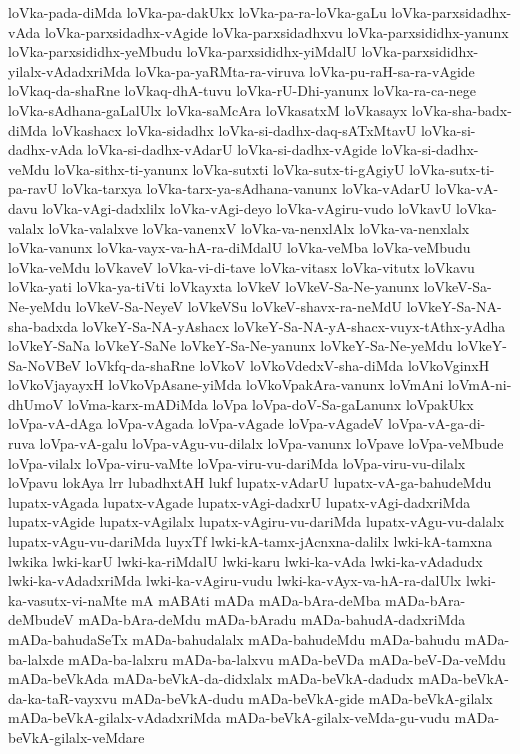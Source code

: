 {loVka-pada-diMda
loVka-pa-dakUkx
loVka-pa-ra-loVka-gaLu
loVka-parxsidadhx-vAda
loVka-parxsidadhx-vAgide
loVka-parxsidadhxvu
loVka-parxsididhx-yanunx
loVka-parxsididhx-yeMbudu
loVka-parxsididhx-yiMdalU
loVka-parxsididhx-yilalx-vAdadxriMda
loVka-pa-yaRMta-ra-viruva
loVka-pu-raH-sa-ra-vAgide
loVkaq-da-shaRne
loVkaq-dhA-tuvu
loVka-rU-Dhi-yanunx
loVka-ra-ca-nege
loVka-sAdhana-gaLalUlx
loVka-saMcAra
loVkasatxM
loVkasayx
loVka-sha-badx-diMda
loVkashacx
loVka-sidadhx
loVka-si-dadhx-daq-sATxMtavU
loVka-si-dadhx-vAda
loVka-si-dadhx-vAdarU
loVka-si-dadhx-vAgide
loVka-si-dadhx-veMdu
loVka-sithx-ti-yanunx
loVka-sutxti
loVka-sutx-ti-gAgiyU
loVka-sutx-ti-pa-ravU
loVka-tarxya
loVka-tarx-ya-sAdhana-vanunx
loVka-vAdarU
loVka-vA-davu
loVka-vAgi-dadxlilx
loVka-vAgi-deyo
loVka-vAgiru-vudo
loVkavU
loVka-valalx
loVka-valalxve
loVka-vanenxV
loVka-va-nenxlAlx
loVka-va-nenxlalx
loVka-vanunx
loVka-vayx-va-hA-ra-diMdalU
loVka-veMba
loVka-veMbudu
loVka-veMdu
loVkaveV
loVka-vi-di-tave
loVka-vitasx
loVka-vitutx
loVkavu
loVka-yati
loVka-ya-tiVti
loVkayxta
loVkeV
loVkeV-Sa-Ne-yanunx
loVkeV-Sa-Ne-yeMdu
loVkeV-Sa-NeyeV
loVkeVSu
loVkeV-shavx-ra-neMdU
loVkeY-Sa-NA-sha-badxda
loVkeY-Sa-NA-yAshacx
loVkeY-Sa-NA-yA-shacx-vuyx-tAthx-yAdha
loVkeY-SaNa
loVkeY-SaNe
loVkeY-Sa-Ne-yanunx
loVkeY-Sa-Ne-yeMdu
loVkeY-Sa-NoVBeV
loVkfq-da-shaRne
loVkoV
loVkoVdedxV-sha-diMda
loVkoVginxH
loVkoVjayayxH
loVkoVpAsane-yiMda
loVkoVpakAra-vanunx
loVmAni
loVmA-ni-dhUmoV
loVma-karx-mADiMda
loVpa
loVpa-doV-Sa-gaLanunx
loVpakUkx
loVpa-vA-dAga
loVpa-vAgada
loVpa-vAgade
loVpa-vAgadeV
loVpa-vA-ga-di-ruva
loVpa-vA-galu
loVpa-vAgu-vu-dilalx
loVpa-vanunx
loVpave
loVpa-veMbude
loVpa-vilalx
loVpa-viru-vaMte
loVpa-viru-vu-dariMda
loVpa-viru-vu-dilalx
loVpavu
lokAya
lrr
lubadhxtAH
lukf
lupatx-vAdarU
lupatx-vA-ga-bahudeMdu
lupatx-vAgada
lupatx-vAgade
lupatx-vAgi-dadxrU
lupatx-vAgi-dadxriMda
lupatx-vAgide
lupatx-vAgilalx
lupatx-vAgiru-vu-dariMda
lupatx-vAgu-vu-dalalx
lupatx-vAgu-vu-dariMda
luyxTf
lwki-kA-tamx-jAcnxna-dalilx
lwki-kA-tamxna
lwkika
lwki-karU
lwki-ka-riMdalU
lwki-karu
lwki-ka-vAda
lwki-ka-vAdadudx
lwki-ka-vAdadxriMda
lwki-ka-vAgiru-vudu
lwki-ka-vAyx-va-hA-ra-dalUlx
lwki-ka-vasutx-vi-naMte
mA
mABAti
mADa
mADa-bAra-deMba
mADa-bAra-deMbudeV
mADa-bAra-deMdu
mADa-bAradu
mADa-bahudA-dadxriMda
mADa-bahudaSeTx
mADa-bahudalalx
mADa-bahudeMdu
mADa-bahudu
mADa-ba-lalxde
mADa-ba-lalxru
mADa-ba-lalxvu
mADa-beVDa
mADa-beV-Da-veMdu
mADa-beVkAda
mADa-beVkA-da-didxlalx
mADa-beVkA-dadudx
mADa-beVkA-da-ka-taR-vayxvu
mADa-beVkA-dudu
mADa-beVkA-gide
mADa-beVkA-gilalx
mADa-beVkA-gilalx-vAdadxriMda
mADa-beVkA-gilalx-veMda-gu-vudu
mADa-beVkA-gilalx-veMdare
}
